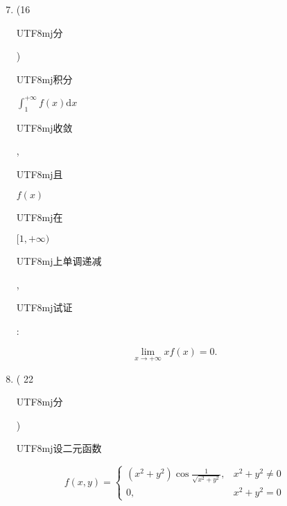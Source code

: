 \documentclass[10pt]{article}
\begin{document}
\begin{enumerate}
  \setcounter{enumi}{6}
  \item (16 \begin{CJK}{UTF8}{mj}分\end{CJK}) \begin{CJK}{UTF8}{mj}积分\end{CJK} $\int_{1}^{+\infty} f(x) \mathrm{d} x$ \begin{CJK}{UTF8}{mj}收敛\end{CJK}, \begin{CJK}{UTF8}{mj}且\end{CJK} $f(x)$ \begin{CJK}{UTF8}{mj}在\end{CJK} $[1,+\infty)$ \begin{CJK}{UTF8}{mj}上单调递减\end{CJK}, \begin{CJK}{UTF8}{mj}试证\end{CJK}:
\end{enumerate}
$$
\lim _{x \rightarrow+\infty} x f(x)=0 .
$$

\begin{enumerate}
  \setcounter{enumi}{7}
  \item ( 22 \begin{CJK}{UTF8}{mj}分\end{CJK}) \begin{CJK}{UTF8}{mj}设二元函数\end{CJK}
\end{enumerate}
$$
f(x, y)=\left\{\begin{array}{lr}
\left(x^{2}+y^{2}\right) \cos \frac{1}{\sqrt{x^{2}+y^{2}}}, & x^{2}+y^{2} \neq 0 \\
0, & x^{2}+y^{2}=0
\end{array}\right.
$$
\end{document}
